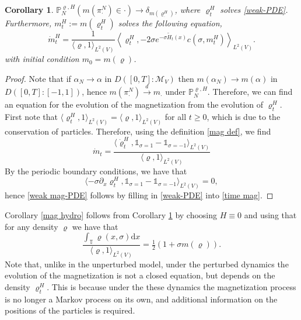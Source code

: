 \documentclass[11pt]{article}
\numberwithin{equation}{section}
\theoremstyle{definition}
\theoremstyle{plain}
\newtheorem{Corollary}[Theorem]{Corollary}
\newcommand{\p}{\mathbb{P}}
\newcommand{\dd}{\mathrm{d}}
\begin{document}
\begin{Corollary}\label{weak mag hydro}
    $\p^{\varrho,H}_N(m(\pi^N_{\cdot})\in \cdot) \to \delta_{m(\varrho^H_\cdot)}$, where $\varrho^H_t$ solves \eqref{weak-PDE}. Furthermore, $m^H_t := m(\varrho^H_t)$ solves the following equation, 
    \begin{equation}\label{weak mag-PDE}
        \dot{m}^H_t =  \frac{1}{\langle \varrho,1\rangle_{L^2(V)}} \left\langle\varrho^H_t, -2\sigma e^{-\sigma \widetilde{H}_t(x)}c(\sigma,m^H_t) \right\rangle_{L^2(V)}.
    \end{equation}
    with initial condition  $m_0 = m(\varrho)$.
\end{Corollary}
\begin{proof}
    Note that if $\alpha_N \to \alpha$  in $D([0,T]:\mathcal{M}_V)$ then $m(\alpha_N) \to m(\alpha)$ in $D([0,T]:[-1,1])$, hence  $m(\pi^N_\cdot) \xrightarrow{d} m_\cdot$ under $\p^{\varrho,H}_N$. Therefore, we can find an equation for the evolution of the magnetization from the evolution of $\varrho^H_t$. First note that $\langle\varrho_t^H,1\rangle_{L^2(V)} = \langle \varrho,1\rangle_{L^2(V)}$ for all $t\geq0$, which is due to the conservation of particles. Therefore, using the definition \eqref{mag def}, we find
        \begin{equation}\label{time mag}
            \dot{m}_t = \frac{\langle \dot{\varrho}^H_t, \mathds{1}_{\sigma=1} - \mathds{1}_{\sigma=-1}\rangle_{L^2(V)}}{\langle\varrho,1\rangle_{L^2(V){}}}
        \end{equation}
    By the periodic boundary conditions, we have that 
        \begin{equation}
            \langle -\sigma \partial_x\varrho_t^H, \mathds{1}_{\sigma=1}-\mathds{1}_{\sigma =-1}\rangle_{L^2(V)} = 0,
        \end{equation}
    hence \eqref{weak mag-PDE} follows by filling in \eqref{weak-PDE} into \eqref{time mag}.
\end{proof}


Corollary \ref{mag hydro} follows from Corollary \ref{weak mag hydro} by choosing $H\equiv0$ and using that for any density $\varrho$ we have that 
\begin{equation}
    \frac{\int_{\mathbb{T}}\varrho(x,\sigma) \dd x }{\langle \varrho,1\rangle_{L^2(V)}} = \tfrac{1}{2}(1+\sigma m(\varrho)).
\end{equation}
Note that, unlike in the unperturbed model, under the perturbed dynamics the evolution of the magnetization is not a closed equation, but depends on the density $\varrho^H_t$. This is because under the these dynamics the magnetization process is no longer a Markov process on its own, and additional information on the positions of the particles is required.
\end{document}
